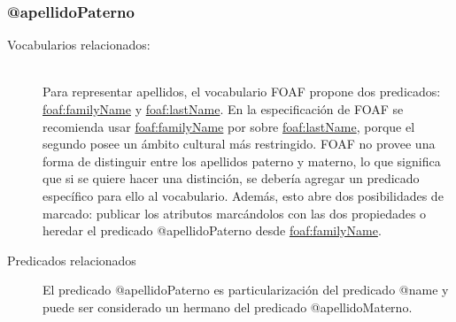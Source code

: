 \subsubsection{@apellidoPaterno}

\begin{description}
  
\item[Vocabularios relacionados:] \hfill \\
  Para representar apellidos, el vocabulario FOAF propone dos
  predicados:
  \url{foaf:familyName} y \url{foaf:lastName}. En la especificación de
  FOAF se recomienda usar \url{foaf:familyName} por sobre
  \url{foaf:lastName}, porque el segundo posee un ámbito cultural más
  restringido. FOAF no provee una forma de distinguir entre los
  apellidos paterno y materno, lo que significa que si se quiere hacer
  una distinción, se debería agregar un predicado específico para ello
  al vocabulario. Además, esto abre dos posibilidades de marcado:
  publicar los atributos marcándolos con las dos propiedades o heredar
  el predicado @apellidoPaterno desde \url{foaf:familyName}.
\item[Predicados relacionados]
  El predicado @apellidoPaterno es particularización del
  predicado @name y puede ser considerado un hermano del predicado
  @apellidoMaterno.
\end{description}
